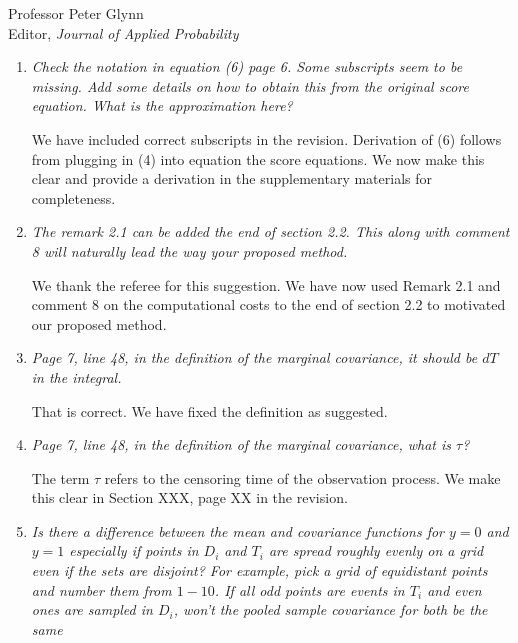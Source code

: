 \documentclass[11pt]{letter} %
\begin{document}
\begin{letter}{Professor
	Peter Glynn\\
	Editor, {\em Journal of Applied Probability}}
\begin{enumerate}
\item {\it Check the notation in equation (6) page 6. Some subscripts seem to be missing. Add some details on how to obtain this from the original score
equation. What is the approximation here?}

\vspace{5mm}
We have included correct subscripts in the revision.  Derivation of (6) follows from plugging in (4) into equation the score equations.  We now make this clear and provide a derivation in the supplementary materials for completeness.
\vspace{5mm}

\item{\it The remark 2.1 can be added the end of section 2.2. This along with
comment 8 will naturally lead the way your proposed method.}

\vspace{5mm}
We thank the referee for this suggestion.  We have now used Remark 2.1 and comment 8 on the computational costs to the end of section 2.2 to motivated our proposed method.
\vspace{5mm}

\item {\it Page 7, line 48, in the definition of the marginal covariance, it should be $dT$ in the integral.}

\vspace{5mm}
That is correct.  We have fixed the definition as suggested.
\vspace{5mm}

\item {\it Page 7, line 48, in the definition of the marginal covariance, what is $\tau$?}

\vspace{5mm}
The term $\tau$ refers to the censoring time of the observation process. We make this clear in Section XXX, page XX in the revision.
\vspace{5mm}


\item {\it Is there a difference between the mean and covariance functions for $y = 0$ and $y = 1$ especially if points in $D_i$ and $T_i$ are spread roughly evenly on a grid even if the sets are disjoint? For example, pick a grid of equidistant points and number them from $1-10$. If all odd points are events in $T_i$ and even ones are sampled in $D_i$, won't the pooled sample covariance for both be the same}


\end{enumerate}
\end{letter}
\end{document}
